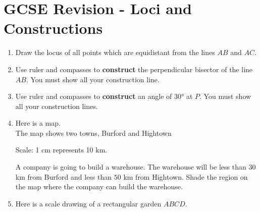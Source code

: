 
\chapter{GCSE Revision - Loci and Constructions}

\begin{enumerate}
  \item Draw the locus of all points which are equidistant from the lines $AB$ and $AC$.
  \begin{figure}[H]
    \centering
  \end{figure}
  \item Use ruler and compasses to \textbf{construct} the perpendicular bisector of the line $AB$. You must show all your construction line.\strch
  \begin{figure}[H]
    \centering
  \end{figure}
  \newpage
  \item Use ruler and compasses to \textbf{construct} an angle of $\ang{30}$ at $P$. You must show all your construction lines.\strch
  \begin{figure}[H]
    \centering
  \end{figure}
  \item Here is a map.\\
  The map shows two towns, Burford and Hightown
  \begin{figure}[H]
    \centering
  \end{figure}
  Scale: 1 cm represents 10 km.\par 
  A company is going to build a warehouse. The warehouse will be less than $30$ km from Burford and less than $50$ km from Hightown. Shade the region on the map where the company can build the warehouse.
  \newpage
  \item Here is a scale drawing of a rectangular garden $ABCD$.
  \begin{figure}[H]
    \centering
\end{figure}
\end{enumerate}
